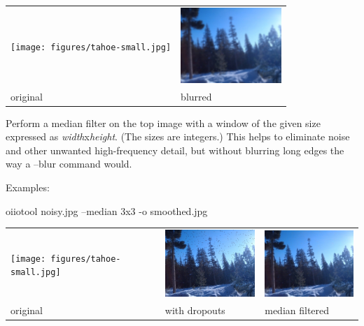 \spc \begin{tabular}{ll}
\texttt{[image: figures/tahoe-small.jpg]} &
\includegraphics[width=1.5in]{figures/tahoe-blur.jpg} \\
original & blurred \\
\end{tabular}
\apiend


Perform a median filter on the top image with a window of the given size
expressed as \emph{width}{\cf x}\emph{height}.  (The sizes are integers.)
This helps to eliminate noise and other unwanted high-frequency detail, but
without blurring long edges the way a {\cf --blur} command would.

\noindent Examples:
\begin{code}
    oiiotool noisy.jpg --median 3x3 -o smoothed.jpg
\end{code}

\spc \begin{tabular}{lll}
\texttt{[image: figures/tahoe-small.jpg]} &
\includegraphics[width=1.5in]{figures/tahoe-pepper.jpg} &
\includegraphics[width=1.5in]{figures/tahoe-pepper-median.jpg} \\
original & with dropouts & median filtered \\
\end{tabular}
\apiend


 

